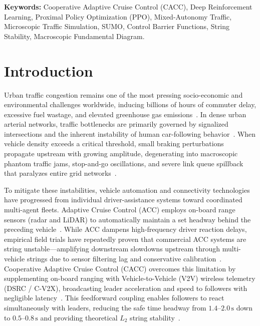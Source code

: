 \documentclass[11pt,a4paper]{article}
\begin{document}
\vspace{0.5em}
\noindent\textbf{Keywords:} Cooperative Adaptive Cruise Control (CACC), Deep Reinforcement Learning, Proximal Policy Optimization (PPO), Mixed-Autonomy Traffic, Microscopic Traffic Simulation, SUMO, Control Barrier Functions, String Stability, Macroscopic Fundamental Diagram.

\section{Introduction}

Urban traffic congestion remains one of the most pressing socio-economic and environmental challenges worldwide, inducing billions of hours of commuter delay, excessive fuel wastage, and elevated greenhouse gas emissions~\cite{Parvini2023, Stern2018}. In dense urban arterial networks, traffic bottlenecks are primarily governed by signalized intersections and the inherent instability of human car-following behavior~\cite{treiber2000congested}. When vehicle density exceeds a critical threshold, small braking perturbations propagate upstream with growing amplitude, degenerating into macroscopic phantom traffic jams, stop-and-go oscillations, and severe link queue spillback that paralyzes entire grid networks~\cite{Sugiyama2008, Zheng2020}.

To mitigate these instabilities, vehicle automation and connectivity technologies have progressed from individual driver-assistance systems toward coordinated multi-agent fleets. Adaptive Cruise Control (ACC) employs on-board range sensors (radar and LiDAR) to automatically maintain a set headway behind the preceding vehicle~\cite{milanes2014modeling, VanArem2006}. While ACC dampens high-frequency driver reaction delays, empirical field trials have repeatedly proven that commercial ACC systems are string unstable---amplifying downstream slowdowns upstream through multi-vehicle strings due to sensor filtering lag and conservative calibration~\cite{Gunter2020, Ciuffo2021}. Cooperative Adaptive Cruise Control (CACC) overcomes this limitation by supplementing on-board ranging with Vehicle-to-Vehicle (V2V) wireless telemetry (DSRC / C-V2X), broadcasting leader acceleration and speed to followers with negligible latency~\cite{milanes2014modeling, Naus2010}. This feedforward coupling enables followers to react simultaneously with leaders, reducing the safe time headway from $1.4\text{--}2.0\,\mathrm{s}$ down to $0.5\text{--}0.8\,\mathrm{s}$ and providing theoretical $L_2$ string stability~\cite{Talebpour2016}.
\end{document}
